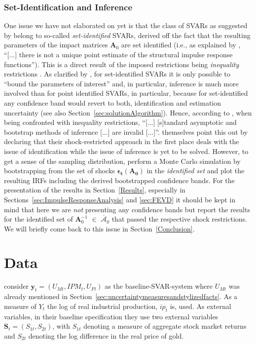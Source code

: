 \documentclass[a4paper,11pt,listof=nochaptergap,oneside,pointednumbers,bibtotoc,bigheadings,liststotoc,hidelinks]{scrbook}
\theoremstyle{mysatz}
\theoremstyle{mydefinition}
\theoremstyle{mytheorem}
\theoremstyle{mybemerkung}
\newcommand{\vect}[1]{\boldsymbol{\mathbf{#1}}}
\begin{document}
\subsection{Set-Identification and Inference}
One issue we have not elaborated on yet is that the class of SVARs as suggested by \citet{ludvigsonetal:19} belong to so-called \textit{set-identified} SVARs, derived off the fact that the resulting parameters of the impact matrices $\vect{A}_0$ are set identified (i.e., as explained by \citet[p. 437]{lutkepohlkilian:17}, ``[...] there is not a unique point estimate of the structural impulse response functions''). This is a direct result of the imposed restrictions being \textit{inequality} restrictions \citep{lutkepohlkilian:17}. As clarified by \citet[p. 422]{lutkepohlkilian:17}, for set-identified SVARs it is only possible to ``bound the parameters of interest'' and, in particular, inference is much more involved than for point identified SVARs, in particular, because for set-identified any confidence band would revert to both, identification and estimation uncertainty (see also Section~\ref{sec:solutionAlgorithm}). Hence, according to \citet[p. 437]{lutkepohlkilian:17}, when being confronted with inequality restrictions, ``[...] [s]tandard asymptotic and bootstrap methods of inference [...] are invalid [...]''. \citet{ludvigsonetal:19} themselves point this out by declaring that their shock-restricted approach in the first place deals with the issue of identification while the issue of inference is yet to be solved. However, to get a sense of the sampling distribution, \citet{ludvigsonetal:19} perform a Monte Carlo simulation by bootstrapping from the set of shocks $\vect{\epsilon_t}({\vect{A_0}})$ in the \textit{identified set} and plot the resulting IRFs including the derived bootstrapped confidence bands. For the presentation of the results in Section~\ref{Results}, especially in Sections~\ref{sec:ImpulseResponseAnalysis} and \ref{sec:FEVD} it should be kept in mind that here we are \textit{not} presenting any confidence bands but report the results for the identified set of $\vect{A}_0^{-1}$ $\in$ $\overline{\vect{\mathcal{A}}}_0$ that passed the respective shock restrictions. We will briefly come back to this issue in Section~\ref{Conclusion}.

\chapter{Data}
\label{sec:Data}

\citet{ludvigsonetal:18, ludvigsonetal:19} consider $\vect{y}_t = (U_{Mt}, IPM_{t}, U_{Ft})$ as the baseline-SVAR-system where $U_{Mt}$ was already mentioned in Section~\ref{sec:uncertaintymeasuresandstylizedfacts}. As a measure of $Y_t$ the log of real industrial production, $ip_t$ is, used. As external variables, in their baseline specification they use two external variables $\vect{S}_t =  (S_{1t}, S_{2t})$, with $S_{1t}$ denoting a measure of aggregate stock market returns and $S_{2t}$ denoting the log difference in the real price of gold.\\
\end{document}
